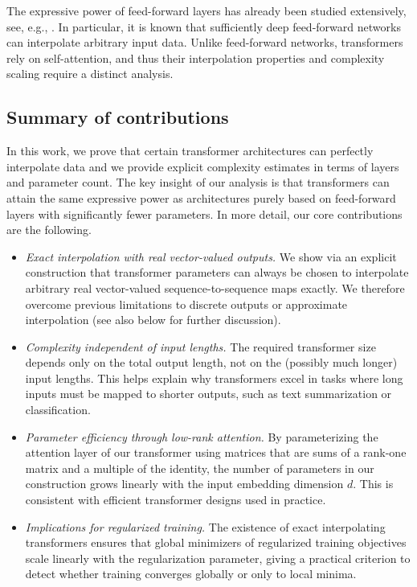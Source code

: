 \documentclass[pdflatex,sn-mathphys-num]{sn-jnl}%
\theoremstyle{thmstyleone}%
\theoremstyle{thmstyletwo}%
\theoremstyle{thmstylethree}%
\numberwithin{equation}{section}
\begin{document}
The expressive power of feed-forward layers has already been studied extensively, see, e.g., \cite{Cybenko1989ApproximationBS, HORNIK1991251, leshno1993multilayer, Pinkus_1999, yarotsky2017error, park2021provable, vardi2022on, li2022deep, domenec2023NODES, alvarez2025clusterClassification}. In particular, it is known \cite{yun2019small} that sufficiently deep feed-forward networks can interpolate arbitrary input data. Unlike feed-forward networks, transformers rely on self-attention, and thus their interpolation properties and complexity scaling require a distinct analysis.

\subsection{Summary of contributions}\label{ss:discussion}

In this work, we prove that certain transformer architectures can perfectly interpolate data and we provide explicit complexity estimates in terms of layers and parameter count. The key insight of our analysis is that transformers can attain the same expressive power as architectures purely based on feed-forward layers with significantly fewer parameters. In more detail, our core contributions are the following.

\begin{itemize}%

\item \textit{Exact interpolation with real vector-valued outputs.}
We show via an explicit construction that transformer parameters can always be chosen to interpolate arbitrary real vector-valued sequence-to-sequence maps exactly. We therefore overcome previous limitations to discrete outputs \cite{kim2023provable} or approximate interpolation \cite{geshkovski2024measure} (see also  below for further discussion).

\item \textit{Complexity independent of input lengths.}
The required transformer size depends only on the total output length, not on the (possibly much longer) input lengths. This helps explain why transformers excel in tasks where long inputs must be mapped to shorter outputs, such as text summarization or classification.

\item \textit{Parameter efficiency through low-rank attention.}
By parameterizing the attention layer of our transformer using matrices that are sums of a rank-one matrix and a multiple of the identity, the number of parameters in our construction grows linearly with the input embedding dimension $d$. This is consistent with efficient transformer designs used in practice.

\item \textit{Implications for regularized training.}
The existence of exact interpolating transformers ensures that global minimizers of regularized training objectives scale linearly with the regularization parameter, giving a practical criterion to detect whether training converges globally or only to local minima.
\end{itemize}
\end{document}
